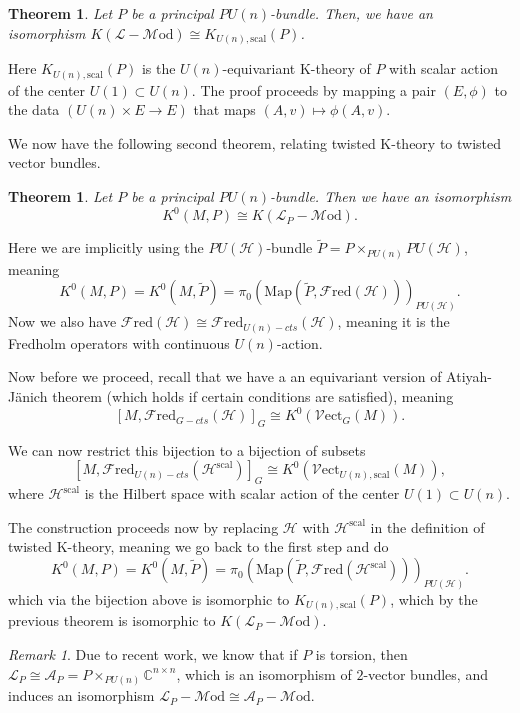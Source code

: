 \documentclass[a4paper]{book}
\newcommand{\lA}{\mathcal{A}}
\newcommand{\bC}{\mathbb{C}}
\newcommand{\lF}{\mathcal{F}}
\newcommand{\lH}{\mathcal{H}}
\newcommand{\lL}{\mathcal{L}}
\newcommand{\lM}{\mathcal{M}}
\newcommand{\lV}{\mathcal{V}}
\newcommand{\Vect}{\lV\mathrm{ect}} %
\newcommand{\Mod}{\lM\mathrm{od}} %
\newcommand{\Fred}{\lF\mathrm{red}}
\newtheorem{theorem}[equation]{Theorem}
\theoremstyle{definition}
\theoremstyle{remark}
\newtheorem{remark}[equation]{Remark}
\numberwithin{equation}{section}
\begin{document}
	\begin{theorem}
		Let $P$ be a principal $PU(n)$-bundle. Then, we have an isomorphism $K(\lL-\Mod) \cong K_{U(n), \mathrm{scal}}(P)$.
	\end{theorem}

	Here $K_{U(n), \mathrm{scal}}(P)$ is the $U(n)$-equivariant K-theory of $P$ with scalar action of the center $U(1) \subset U(n)$. The proof proceeds by mapping a pair $(E,\phi)$ to the data $(U(n) \times E \to E)$ that maps $(A,v) \mapsto \phi(A,v)$.

	We now have the following second theorem, relating twisted K-theory to twisted vector bundles.

	\begin{theorem}
	 Let $P$ be a principal $PU(n)$-bundle. Then we have an isomorphism
	 \[ K^0(M,P) \cong K(\lL_P-\Mod). \]
	\end{theorem}

	Here we are implicitly using the $PU(\lH)$-bundle $\tilde{P} = P \times_{PU(n)} PU(\lH)$, meaning 
	\[K^0(M,P) = K^0(M,\tilde{P}) = \pi_0(\mathrm{Map}(\tilde{P}, \Fred(\lH)))_{PU(\lH)}.\] 
Now we also have $\Fred(\lH)	\cong \Fred_{U(n)-cts}(\lH)$, meaning it is the Fredholm operators with continuous $U(n)$-action.

Now before we proceed, recall that we have a an equivariant version of Atiyah-J\"anich theorem (which holds if certain conditions are satisfied), meaning 
\[ [M,\Fred_{G-cts}(\lH)]_G \cong K^0(\Vect_G(M)). \]

We can now restrict this bijection to a bijection of subsets 
\[[M,\Fred_{U(n)-cts}(\lH^{\mathrm{scal}})]_G \cong K^0(\Vect_{U(n),\mathrm{scal}}(M)), \]
where $\lH^{\mathrm{scal}}$ is the Hilbert space with scalar action of the center $U(1) \subset U(n)$. 

The construction proceeds now by replacing $\lH$ with $\lH^{\mathrm{scal}}$ in the definition of twisted K-theory, meaning we go back to the first step and do 
	\[K^0(M,P) = K^0(M,\tilde{P}) = \pi_0(\mathrm{Map}(\tilde{P}, \Fred(\lH^{\mathrm{scal}})))_{PU(\lH)}.\]
	which via the bijection above is isomorphic to $K_{U(n),\mathrm{scal}}(P)$, which by the previous theorem is isomorphic to $K(\lL_P-\Mod)$. 

\begin{remark}
	Due to recent work, we know that if $P$ is torsion, then $\lL_P \cong \lA_P = P \times_{PU(n)}\bC^{n \times n}$, which is an isomorphism of $2$-vector bundles, and induces an isomorphism $\lL_P-\Mod \cong \lA_P-\Mod$.
\end{remark}
\end{document}
